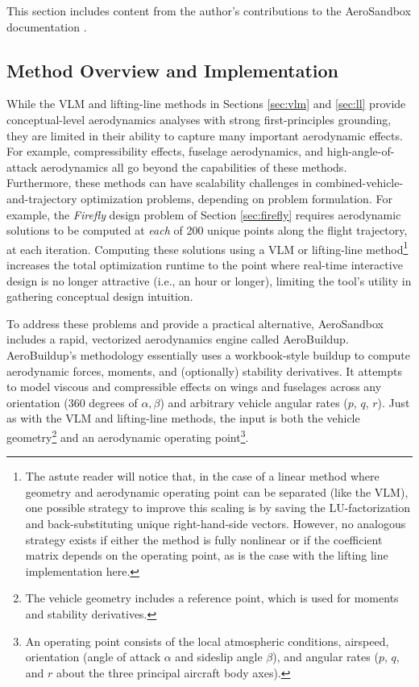 \begin{attrib}
    This section includes content from the author's contributions to the AeroSandbox documentation \cite{asb_github}.
\end{attrib}

\subsection{Method Overview and Implementation}

While the VLM and lifting-line methods in Sections \ref{sec:vlm} and \ref{sec:ll} provide conceptual-level aerodynamics analyses with strong first-principles grounding, they are limited in their ability to capture many important aerodynamic effects. For example, compressibility effects, fuselage aerodynamics, and high-angle-of-attack aerodynamics all go beyond the capabilities of these methods. Furthermore, these methods can have scalability challenges in combined-vehicle-and-trajectory optimization problems, depending on problem formulation. For example, the \emph{Firefly} design problem of Section \ref{sec:firefly} requires aerodynamic solutions to be computed at \emph{each} of 200 unique points along the flight trajectory, at each iteration. Computing these solutions using a VLM or lifting-line method\footnote{The astute reader will notice that, in the case of a linear method where geometry and aerodynamic operating point can be separated (like the VLM), one possible strategy to improve this scaling is by saving the LU-factorization and back-substituting unique right-hand-side vectors. However, no analogous strategy exists if either the method is fully nonlinear or if the coefficient matrix depends on the operating point, as is the case with the lifting line implementation here.} increases the total optimization runtime to the point where real-time interactive design is no longer attractive (i.e., an hour or longer), limiting the tool's utility in gathering conceptual design intuition.

To address these problems and provide a practical alternative, AeroSandbox includes a rapid, vectorized aerodynamics engine called AeroBuildup. AeroBuildup's methodology essentially uses a workbook-style buildup to compute aerodynamic forces, moments, and (optionally) stability derivatives. It attempts to model viscous and compressible effects on wings and fuselages across any orientation (360 degrees of $\alpha, \beta$) and arbitrary vehicle angular rates ($p$, $q$, $r$). Just as with the VLM and lifting-line methods, the input is both the vehicle geometry\footnote{The vehicle geometry includes a reference point, which is used for moments and stability derivatives.} and an aerodynamic operating point\footnote{An operating point consists of the local atmospheric conditions, airspeed, orientation (angle of attack $\alpha$ and sideslip angle $\beta$), and angular rates ($p$, $q$, and $r$ about the three principal aircraft body axes).}.


